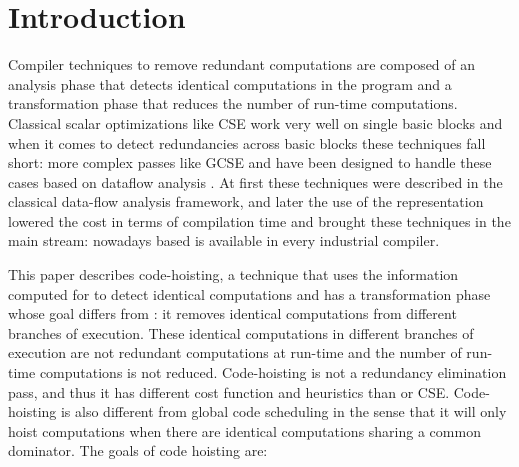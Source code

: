 \documentclass{sig-alternate}
\begin{document}
\section{Introduction}

Compiler techniques to remove redundant computations are composed of an analysis
phase that detects identical computations in the program and a transformation
phase that reduces the number of run-time computations.  Classical scalar
optimizations like CSE \cite{dragonbook} work very well on single basic blocks and
when it comes to detect redundancies across basic blocks these techniques fall
short: more complex passes like GCSE and \PRE{} have been designed to handle these
cases based on dataflow analysis \cite{morel1979global}.  At first these
techniques were described in the classical data-flow analysis framework, and
later the use of the \SSA{} representation lowered the cost in terms of compilation
time \cite{briggs1994effective,chow1997new,kennedy1999partial} and brought these
techniques in the main stream: nowadays \SSA{} based \PRE{} is available in every
industrial compiler.

This paper describes code-hoisting, a technique that uses the information
computed for \PRE{} to detect identical computations and has a transformation
phase whose goal differs from \PRE{}: it removes identical computations from
different branches of execution.  These identical computations in different
branches of execution are not redundant computations at run-time and the number
of run-time computations is not reduced. Code-hoisting is not a redundancy
elimination pass, and thus it has different cost function and heuristics than
\PRE{} or CSE.  Code-hoisting is also different from global code scheduling
\cite{dragonbook,click1995global} in the sense that it will only hoist
computations when there are identical computations sharing a common
dominator. The goals of code hoisting are:
\end{document}
